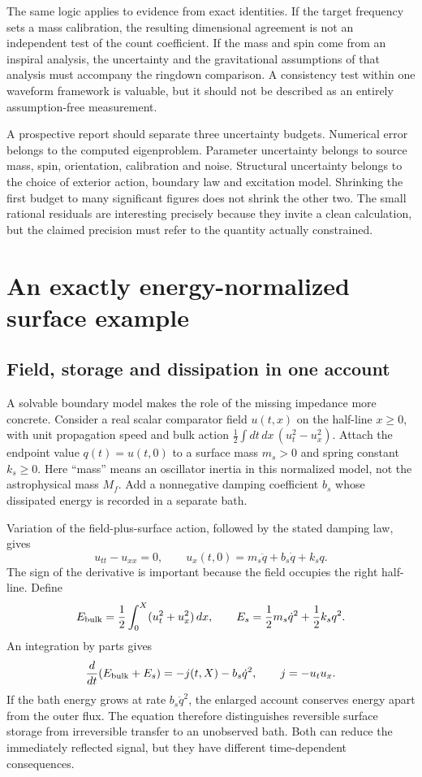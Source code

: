The same logic applies to evidence from exact identities. If the target frequency sets a mass calibration, the resulting dimensional agreement is not an independent test of the count coefficient. If the mass and spin come from an inspiral analysis, the uncertainty and the gravitational assumptions of that analysis must accompany the ringdown comparison. A consistency test within one waveform framework is valuable, but it should not be described as an entirely assumption-free measurement.

A prospective report should separate three uncertainty budgets. Numerical error belongs to the computed eigenproblem. Parameter uncertainty belongs to source mass, spin, orientation, calibration and noise. Structural uncertainty belongs to the choice of exterior action, boundary law and excitation model. Shrinking the first budget to many significant figures does not shrink the other two. The small rational residuals are interesting precisely because they invite a clean calculation, but the claimed precision must refer to the quantity actually constrained.

\section{An exactly energy-normalized surface example}
\subsection{Field, storage and dissipation in one account}
A solvable boundary model makes the role of the missing impedance more concrete. Consider a real scalar comparator field $u(t,x)$ on the half-line $x\geq0$, with unit propagation speed and bulk action $\tfrac12\int dt\,dx\,(u_t^2-u_x^2)$. Attach the endpoint value $q(t)=u(t,0)$ to a surface mass $m_s>0$ and spring constant $k_s\geq0$. Here ``mass'' means an oscillator inertia in this normalized model, not the astrophysical mass $M_f$. Add a nonnegative damping coefficient $b_s$ whose dissipated energy is recorded in a separate bath.

Variation of the field-plus-surface action, followed by the stated damping law, gives
\begin{equation}
 u_{tt}-u_{xx}=0,\qquad
 u_x(t,0)=m_s\ddot q+b_s\dot q+k_sq.
 \label{c11:oscillatorboundary}
\end{equation}
The sign of the derivative is important because the field occupies the right half-line. Define
\begin{equation}
 E_{\rm bulk}=\frac12\int_0^X(u_t^2+u_x^2)\,dx,
 \qquad E_s=\frac12m_s\dot q^2+\frac12k_sq^2.
 \label{c11:oscillatorenergy}
\end{equation}
An integration by parts gives
\begin{equation}
 \frac{d}{dt}(E_{\rm bulk}+E_s)
 =-j(t,X)-b_s\dot q^2,
 \qquad j=-u_tu_x.
 \label{c11:oscillatorbalance}
\end{equation}
If the bath energy grows at rate $b_s\dot q^2$, the enlarged account conserves energy apart from the outer flux. The equation therefore distinguishes reversible surface storage from irreversible transfer to an unobserved bath. Both can reduce the immediately reflected signal, but they have different time-dependent consequences.

